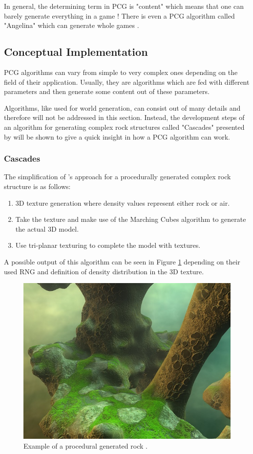 \documentclass[MGS,Master,english]{twbook}%
\begin{document}
In general, the determining term in \ac{PCG} is "content" which means that one can barely generate everything in a game \cite{pcg::book}! There is even a \ac{PCG} algorithm called "Angelina" which can generate whole games \cite{pcg::angelina}.

\subsection{Conceptual Implementation}
\ac{PCG} algorithms can vary from simple to very complex ones depending on the field of their application. Usually, they are algorithms which are fed with different parameters and then generate some content out of these parameters.

Algorithms, like used for world generation, can consist out of many details and therefore will not be addressed in this section. Instead, the development steps of an algorithm for generating complex rock structures called "Cascades" presented by \cite{nvidia::cascades} will be shown to give a quick insight in how a \ac{PCG} algorithm can work.

\subsubsection{Cascades}
The simplification of 's approach for a procedurally generated complex rock structure is as follows:
\begin{enumerate}
	\item \ac{3D} texture generation where density values represent either rock or air.
	\item Take the texture and make use of the Marching Cubes algorithm to generate the actual \ac{3D} model.
	\item Use tri-planar texturing to complete the model with textures.
\end{enumerate}
A possible output of this algorithm can be seen in Figure \ref{cascadesFigure} depending on their used \ac{RNG} and definition of density distribution in the \ac{3D} texture. 
\begin{figure}[!htbp]
	\centering
	\includegraphics[width=0.5\linewidth]{PICs/cascades_small}
	\caption{Example of a procedural generated rock \protect\cite{nvidia::cascades}.}\label{cascadesFigure}
\end{figure}
\end{document}
